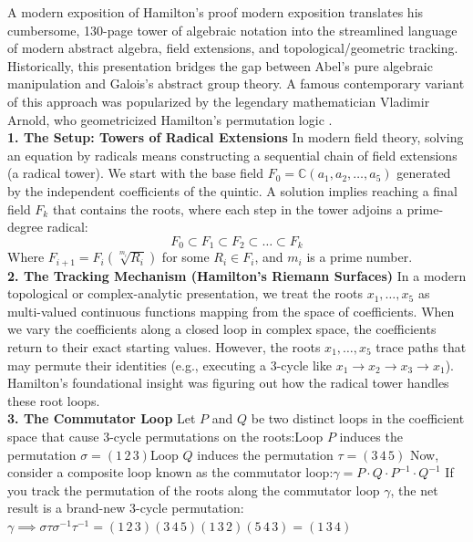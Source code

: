 A modern exposition of Hamilton's proof modern exposition translates his cumbersome, 130-page tower of algebraic notation into the streamlined language of modern abstract algebra, field extensions, and topological/geometric tracking.
Historically, this presentation bridges the gap between Abel's pure algebraic manipulation and Galois's abstract group theory. 
A famous contemporary variant of this approach was popularized by the legendary mathematician Vladimir Arnold, who geometricized Hamilton's permutation logic \cite{Alekseev}.\\

{\bf 1. The Setup: Towers of Radical Extensions}
In modern field theory, solving an equation by radicals means constructing a sequential chain of field extensions (a radical tower). 
We start with the base field \(F_0 = \mathbb{C}(a_1, a_2, \dots, a_5)\) generated by the independent coefficients of the quintic.
A solution implies reaching a final field \(F_{k}\) that contains the roots, where each step in the tower adjoins a prime-degree radical:
\[F_{0}\subset F_{1}\subset F_{2}\subset \dots \subset F_{k}\]
Where \(F_{i+1} = F_i(\sqrt[m_i]{R_i})\) for some \(R_i \in F_i\), and \(m_{i}\) is a prime number.\\

{\bf 2. The Tracking Mechanism (Hamilton's Riemann Surfaces)}
In a modern topological or complex-analytic presentation, we treat the roots \(x_1, \dots, x_5\) as multi-valued continuous functions mapping from the space of coefficients.
When we vary the coefficients along a closed loop in complex space, the coefficients return to their exact starting values.
However, the roots \(x_1, \dots, x_5\) trace paths that may permute their identities (e.g., executing a 3-cycle like \(x_1 \to x_2 \to x_3 \to x_1\)).
Hamilton's foundational insight was figuring out how the radical tower handles these root loops.\\

{\bf 3. The Commutator Loop}
Let \(P\) and \(Q\) be two distinct loops in the coefficient space that cause 3-cycle permutations on the roots:Loop \(P\) induces the permutation \(\sigma = (1\,2\,3)\)Loop \(Q\) induces the permutation \(\tau = (3\,4\,5)\)
Now, consider a composite loop known as the commutator loop:\(\gamma =P\cdot Q\cdot P^{-1}\cdot Q^{-1}\)
If you track the permutation of the roots along the commutator loop \(\gamma \), the net result is a brand-new 3-cycle permutation:
\(\gamma \implies \sigma \tau \sigma ^{-1}\tau ^{-1}=(1\,2\,3)(3\,4\,5)(1\,3\,2)(5\,4\,3)=(1\,3\,4)\)\\

